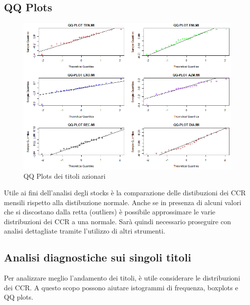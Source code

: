 \documentclass[12pt]{article}
\begin{document}
\subsection{QQ Plots}
\begin{figure}[!htb]
    \centering
    \includegraphics[width=1\textwidth]{immagini/qq.png}
    \caption{QQ Plots dei titoli azionari}
\end{figure}
\FloatBarrier
Utile ai fini dell'analisi degli stocks è la comparazione delle distibuzioni dei CCR mensili rispetto alla distibuzione normale. Anche se in presenza di alcuni valori che si discostano dalla retta (outliers) è possibile approssimare le varie distribuzioni dei CCR a una normale. Sarà quindi necessario proseguire con analisi dettagliate tramite l'utilizzo di altri strumenti.
\newpage
\subsection{Analisi diagnostiche sui singoli titoli}
Per analizzare meglio l'andamento dei titoli, è utile considerare le distribuzioni dei CCR. A questo scopo possono aiutare istogrammi di frequenza, boxplots e QQ plots.
\end{document}
